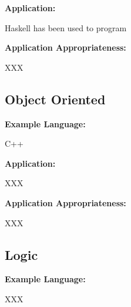 \documentclass[hidelinks,12pt]{article}
\begin{document}
\begin{addmargin}[1cm]{0em}%
\textbf{Application:}
	\begin{addmargin}[1cm]{0em}%
		Haskell has been used to program
	\end{addmargin}
\end{addmargin}

\begin{addmargin}[1cm]{0em}%
\textbf{Application Appropriateness:}
	\begin{addmargin}[1cm]{0em}%
		XXX
	\end{addmargin}
\end{addmargin}

\subsection{Object Oriented}
\begin{addmargin}[1cm]{0em}%
\textbf{Example Language:}
	\begin{addmargin}[1cm]{0em}%
		C++
	\end{addmargin}
\end{addmargin}

\begin{addmargin}[1cm]{0em}%
\textbf{Application:}
	\begin{addmargin}[1cm]{0em}%
		XXX
	\end{addmargin}
\end{addmargin}

\begin{addmargin}[1cm]{0em}%
\textbf{Application Appropriateness:}
	\begin{addmargin}[1cm]{0em}%
		XXX
	\end{addmargin}
\end{addmargin}

\subsection{Logic}
\begin{addmargin}[1cm]{0em}%
\textbf{Example Language:}
	\begin{addmargin}[1cm]{0em}%
		XXX
	\end{addmargin}
\end{addmargin}
\end{document}
